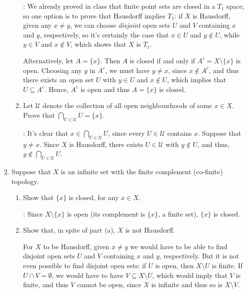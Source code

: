 \documentclass[letterpaper,12pt]{article}
\begin{document}
\begin{enumerate}
\begin{enumerate}
\bigskip

: We already proved in class that finite point sets are closed in a $T_1$ space, so one option is to prove that Hausdorff implies $T_1$: if $X$ is Hausdorff, given any $x\neq y$, we can choose {\em disjoint} open sets $U$ and $V$ containing $x$ and $y$, respectively, so it's certainly the case that $x\in U$ and $y\notin U$, while $y\in V$ and $x\notin V$, which shows that $X$ is $T_1$.

Alternatively, let $A=\{x\}$. Then $A$ is closed if and only if $A^c = X\setminus\{x\}$ is open. Choosing any $y$ in $A^c$, we must have $y\neq x$, since $x\notin A^c$, and thus there exists an open set $U$ with $y\in U$ and $x\notin U$, which implies that $U\subseteq A^c$.
Hence, $A^c$ is open and thus $A=\{x\}$ is closed.

 \item Let $\mathcal{U}$ denote the collection of all open neighbourhoods of some $x\in X$. Prove that $\bigcap_{U\in \mathcal{U}}U = \{x\}$.

\bigskip

: It's clear that $x\in\bigcap_{U\in\mathcal{U}}U$, since every $U\in\mathcal{U}$ contains $x$. Suppose that $y\neq x$. Since $X$ is Hausdorff, there exists $U\in\mathcal{U}$ with $y\notin U$, and thus, $y\notin \bigcap_{U\in\mathcal{U}}U$.
\end{enumerate}
 \item Suppose that $X$ is an infinite set with the finite complement (co-finite) topology.
\begin{enumerate}
 \item Show that $\{x\}$ is closed, for any $x\in X$.

\bigskip

: Since $X\setminus\{x\}$ is open (its complement is $\{x\}$, a finite set), $\{x\}$ is closed.

 \item Show that, in spite of part (a), $X$ is not Hausdorff.

\bigskip

For $X$ to be Hausdorff, given $x\neq y$ we would have to be able to find disjoint open sets $U$ and $V$ containing $x$ and $y$, respectively. But it is not even possible to find disjoint open sets: if $U$ is open, then $X\setminus U$ is finite. If $U\cap V=\emptyset$, we would have to have $V\subseteq X\setminus U$, which would imply that $V$ is finite, and thus $V$ cannot be open, since $X$ is infinite and thus so is $X\setminus V$.


\end{enumerate}
\end{enumerate}
\end{document}
